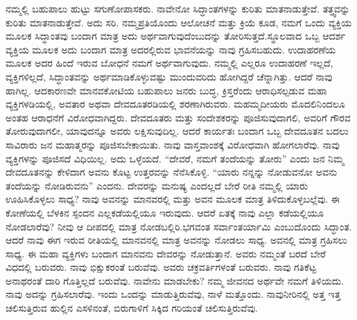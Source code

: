 ನಮ್ಮಲ್ಲಿ ಬಹುಪಾಲು ಹುಟ್ಟು ಸಗುಣೋಪಾಸಕರು. ನಾವೇನೋ ಸಿದ್ಧಾಂತಗಳನ್ನು ಕುರಿತು ಮಾತನಾಡುತ್ತೇವೆ. ತತ್ತ್ವವನ್ನು ಕುರಿತು ಮಾತನಾಡುತ್ತೇವೆ. ಅದು ಸರಿ. ನಮ್ಮ\break ಪ್ರತಿಯೊಂದು ಆಲೋಚನೆ ಮತ್ತು ಕ್ರಿಯೆ ಕೂಡ, ನಮಗೆ ಒಂದು ವ್ಯಕ್ತಿಯ ಮೂಲಕ ಸಿದ್ಧಾಂತವು ಬಂದಾಗ ಮಾತ್ರ ಅದು ಅರ್ಥವಾಗುವುದೆಂಬುದನ್ನು ತೋರಿಸುತ್ತದೆ.\break ಸ್ಥೂಲವಾದ ಒಬ್ಬ ಆದರ್ಶ ವ್ಯಕ್ತಿಯ ಮೂಲಕ ಅದು ಬಂದಾಗ ಮಾತ್ರ ಅದರಲ್ಲಿರುವ ಭಾವನೆಯನ್ನು ನಾವು ಗ್ರಹಿಸಬಹುದು. ಉದಾಹರಣೆಯ ಮೂಲಕ ಅದರ ಹಿಂದೆ ಇರುವ ಬೋಧನೆ ನಮಗೆ ಅರ್ಥವಾಗುವುದು. ನಮ್ಮಲ್ಲಿ ಎಲ್ಲರೂ ಉದಾಹರಣೆ ಇಲ್ಲದೆ, ವ್ಯಕ್ತಿಗಳಿಲ್ಲದೆ, ಸಿದ್ಧಾಂತವನ್ನು ಅರ್ಥಮಾಡಿಕೊಳ್ಳುವಷ್ಟು ಮುಂದುವರಿದು ಹೋಗಿದ್ದರೆ ಚೆನ್ನಾಗಿತ್ತು. ಆದರೆ ನಾವು ಹಾಗಿಲ್ಲ. ಆದಕಾರಣವೇ ಮಾನವಕೋಟಿಯ ಬಹುಪಾಲು ಜನರು ಬುದ್ಧ, ಕ್ರಿಸ್ತರೆಂದು ಆರಾಧಿಸಲ್ಪಡುವ ಮಹಾ ವ್ಯಕ್ತಿಗಳಡಿಯಲ್ಲಿ, ಅವತಾರ ಅಥವಾ ದೇವದೂತರಡಿ\-ಯಲ್ಲಿ ಶರಣಾಗಿರುವರು. ಮಹಮ್ಮದೀಯರು ಮೊದಲಿನಿಂದಲೂ ಅಂತಹ ಆರಾಧನೆಗೆ ವಿರೋಧವಾಗಿದ್ದರು. ದೇವದೂತರು ಮತ್ತು ಸಂದೇಶಕರನ್ನು ಪೂಜಿಸುವುದಾಗಲಿ, ಅವರಿಗೆ ಗೌರವ ತೋರುವುದಾಗಲೀ, ಯಾವುದನ್ನೂ ಅವರು ಲಕ್ಷಿಸುವುದಿಲ್ಲ. ಆದರೆ ಕಾರ್ಯತಃ ಬಂದಾಗ ಒಬ್ಬ ದೇವದೂತನ ಬದಲು ಸಾವಿರಾರು ಜನ ಮಹಾತ್ಮರನ್ನು ಪೂಜಿಸಬೇಕಾಯಿತು. ನಾವು ವಾಸ್ತವಾಂಶಕ್ಕೆ ವಿರೋಧವಾಗಿ ಹೋಗಲಾರೆವು. ನಾವು ವ್ಯಕ್ತಿಗಳನ್ನು ಪೂಜಿಸದೆ ವಿಧಿಯಿಲ್ಲ. ಅದು ಒಳ್ಳೆಯದೆ. “ದೇವರೆ, ನಮಗೆ ತಂದೆಯನ್ನು ತೋರು” ಎಂದು ಜನ ನಿಮ್ಮ ದೇವದೂತನನ್ನು ಕೇಳಿದಾಗ ಅವನು ಕೊಟ್ಟ ಉತ್ತರವನ್ನು ನೆನೆಸಿಕೊಳ್ಳಿ. “ಯಾರು ನನ್ನನ್ನು ನೋಡುವನೋ ಅವನು ತಂದೆಯನ್ನು ನೋಡಿರುವನು” ಎಂದನು. ದೇವರನ್ನು ಮನುಷ್ಯ ಎಂದಲ್ಲದೆ ಬೇರೆ ರೀತಿ ನಮ್ಮಲ್ಲಿ ಯಾರು ಊಹಿಸಿಕೊಳ್ಳಲು ಸಾಧ್ಯ? ನಾವು ಅವನನ್ನು ಮಾನವರಲ್ಲಿ ಮತ್ತು ಅವನ ಮೂಲಕ ಮಾತ್ರ ತಿಳಿದುಕೊಳ್ಳಬಲ್ಲೆವು. ಈ ಕೋಣೆಯಲ್ಲಿ ಬೆಳಕಿನ ಸ್ಪಂದನ ಎಲ್ಲಕಡೆಯಲ್ಲಿಯೂ ಇರುವುದು. ಆದರೆ ಏತಕ್ಕೆ ನಾವು ಎಲ್ಲಾ ಕಡೆಯಲ್ಲಿಯೂ ನೋಡಲಾರೆವು? ನೀವು ಆ ದೀಪದಲ್ಲಿ ಮಾತ್ರ ನೋಡಬಲ್ಲಿರಿ.\break ಭಗವಂತ ಸರ್ವಾಂತರ್ಯಾಮಿ ಎಂಬುದೊಂದು ಸಿದ್ಧಾಂತ. ಆದರೆ ನಾವು ಈಗ ಇರುವ ರೀತಿಯಲ್ಲಿ ಮಾನವನಲ್ಲಿ ಮಾತ್ರ ಅವನನ್ನು ನೋಡಲು ಸಾಧ್ಯ. ಅವನಲ್ಲಿ ಮಾತ್ರ ಗ್ರಹಿಸಲು ಸಾಧ್ಯ. ಈ ಮಹಾ ವ್ಯಕ್ತಿಗಳು ಬಂದಾಗ ಮಾನವನು ದೇವರನ್ನು ನೋಡುತ್ತಾನೆ. ಅವರು ನಮ್ಮಂತೆ ಬರದೆ ಬೇರೆ ವಿಧದಲ್ಲಿ ಬರುವರು. ನಾವು ಭಿಕ್ಷುಕರಂತೆ ಬರುವೆವು. ಅವರು ಚಕ್ರವರ್ತಿಗಳಂತೆ ಬರುವರು. ನಾವು ಗತಿಕೆಟ್ಟ ಅನಾಥರಂತೆ ದಾರಿ ಗೊತ್ತಿಲ್ಲದೆ ಬರುವೆವು. ನಾವೇನು ಮಾಡಬೇಕು? ನಮ್ಮ ಜೀವನದ ಅರ್ಥವೇ ನಮಗೆ ತಿಳಿಯದು. ನಾವು ಅದನ್ನು ಗ್ರಹಿಸಲಾರೆವು. ಇಂದು ಒಂದನ್ನು ಮಾಡುತ್ತಿರುವೆವು, ನಾಳೆ ಮತ್ತೊಂದು. ನಾವು\break ನೀರಿನಲ್ಲಿ ಅತ್ತ ಇತ್ತ ಚಲಿಸುತ್ತಿರುವ ಹುಲ್ಲಿನ ಎಸಳಿನಂತೆ, ಬಿರುಗಾಳಿಗೆ ಸಿಕ್ಕಿದ ಗರಿಯಂತೆ ಚಲಿಸುತ್ತಿರುವೆವು.

